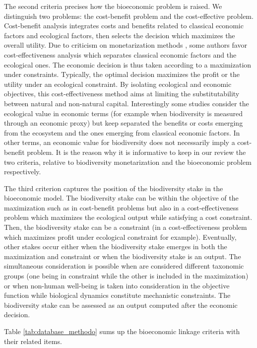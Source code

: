 The second criteria precises how the bioeconomic problem is raised. We distinguish two problems: the cost-benefit problem and the cost-effective problem. Cost-benefit analysis integrates costs and benefits related to classical economic factors and ecological factors, then selects the decision which maximizes the overall utility. Due to criticism on monetarization methods \citep{Diamond94}, some authors favor cost-effectiveness analysis which separates classical economic factors and the ecological ones. The economic decision is thus taken according to a maximization under constraints. Typically, the optimal decision maximizes the profit or the utility under an ecological constraint.  By isolating ecological and economic objectives, this cost-effectiveness method aims at limiting the substitutability between natural and non-natural capital. 
Interestingly some studies consider the ecological value in economic terms (for example when biodiversity is measured through an economic proxy) but keep separated the benefits or costs emerging from the ecosystem  and the ones emerging from classical economic factors. In other terms, an economic value for biodiversity does not necessarily imply a cost-benefit problem. It is the reason why it is informative to keep in our review the two criteria, relative to biodiversity monetarization and the bioeconomic problem respectively.

The third criterion captures the position of the biodiversity stake in the bioeconomic model. The biodiversity stake can be within the objective of the maximization such as in cost-benefit problems but also in a cost-effectiveness problem which
maximizes the ecological output while satisfying a cost constraint. Then, the biodiversity stake can be a constraint (in a cost-effectiveness problem which maximizes profit under ecological constraint for example). Eventually, other stakes occur either when the biodiversity stake emerges in both the maximization and constraint or when the biodiversity stake is an output. The simultaneous consideration is possible when are considered different taxonomic groups (one being in constraint while the other is included in the maximization) or when non-human well-being is taken into consideration in the objective function while biological dynamics constitute mechanistic constraints. The biodiversity stake can be assessed as an output computed after the economic decision. 

Table \ref{tab:database_methodo} sums up the bioeconomic linkage criteria with their related items.

